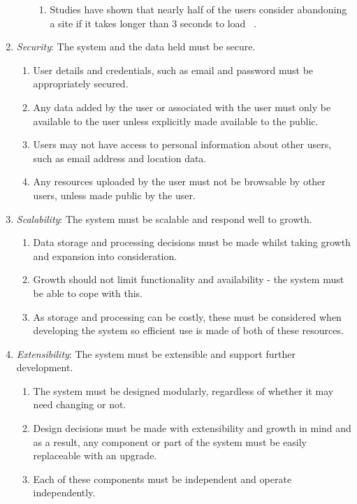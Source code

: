 \begin{enumerate}[label=\textbf{NF\arabic*}]
\begin{enumerate}
			\begin{enumerate}
				\item Studies have shown that nearly half of the users consider abandoning a site if it takes longer than 3 seconds to load ~\cite{Kissmetrics:Speed}.
			\end{enumerate}
		\end{enumerate}
	\item \textit{Security}: The system and the data held must be secure.
		\begin{enumerate}
			\item User details and credentials, such as email and password must be appropriately secured.
			\item Any data added by the user or associated with the user must only be available to the user unless explicitly made available to the public.
			\item Users may not have access to personal information about other users, such as email address and location data.
			\item Any resources uploaded by the user must not be browsable by other users, unless made public by the user.
		\end{enumerate}
	\item \textit{Scalability}: The system must be scalable and respond well to growth.
		\begin{enumerate}
			\item Data storage and processing decisions must be made whilst taking growth and expansion into consideration.
			\item Growth should not limit functionality and availability - the system must be able to cope with this.
			\item As storage and processing can be costly, these must be considered when developing the system so efficient use is made of both of these resources.
		\end{enumerate}
	\item \textit{Extensibility}: The system must be extensible and support further development.
		\begin{enumerate}
			\item The system must be designed modularly, regardless of whether it may need changing or not.
			\item Design decisions must be made with extensibility and growth in mind and as a result, any component or part of the system must be easily replaceable with an upgrade.
			\item Each of these components must be independent and operate independently.

\end{enumerate}
\end{enumerate}

